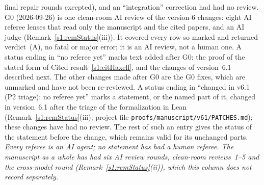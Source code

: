 final repair rounds excepted), and an ``integration'' correction had had no
review. G0 (2026-09-26) is one clean-room AI review of the version-6 changes:
eight AI referee lenses that read only the manuscript and the cited papers, and
an AI judge (Remark~\ref{s1:remStatus}(iii)). It covered every row so marked
and returned verdict~(A), no fatal or major error; it is an AI review, not a
human one. A status ending in ``no referee yet'' marks text added after G0: the proof
of the stated form of Cited result~\ref{s1:citHaxell}, and the changes of
version~6.1 described next. The other changes made after G0 are the G0 fixes,
which are unmarked and have not been re-reviewed. A status ending in ``changed in v6.1 (P2
triage): no referee yet'' marks a statement, or the named part of it, changed
in version~6.1 after the triage of the formalization in Lean
(Remark~\ref{s1:remStatus}(iii); project file
\texttt{proofs/\allowbreak{}manuscript/\allowbreak{}v61/\allowbreak{}PATCHES.md});
these changes have had no review.
The rest of such an entry gives the
status of the statement before the change, which remains valid for its
unchanged parts.
\emph{Every referee is an AI agent; no statement has had a human referee. The
manuscript as a whole has had six AI review rounds, clean-room reviews~1--5
and the cross-model round (Remark~\ref{s1:remStatus}(ii)), which this column does not record
separately.}

